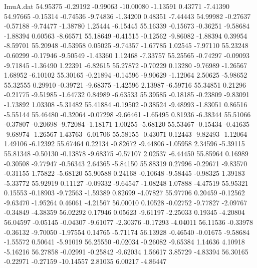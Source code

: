 \begin{filecontents}{ImuA.dat}
  54.95375   -0.29192   -0.99063  -10.00080   -1.13591    0.43771   -7.41390
  54.97665   -0.15314   -0.74536   -9.74836   -1.34200    0.48351   -7.44443
  54.99982   -0.27637   -0.57188   -9.74477   -1.38780    1.25444   -6.15445
  55.16339   -0.15673   -0.36251   -9.58684   -1.88394    0.60563   -8.66571
  55.18649   -0.41515   -0.12562   -9.86082   -1.88394    0.39954   -8.59701
  55.20948   -0.53958    0.05025   -9.74357   -1.67785    1.02545   -7.97110
  55.23248   -0.60299   -0.17946   -9.50549   -1.43360    1.12468   -7.33757
  55.25565   -0.74297   -0.09093   -9.71845   -1.36490    1.22391   -6.82615
  55.27872   -0.70229    0.13280   -9.76989   -1.26567    1.68952   -6.10102
  55.30165   -0.21894   -0.14596   -9.90629   -1.12064    2.50625   -5.98652
  55.32555    0.29910   -0.39721   -9.68375   -1.42596    2.13987   -6.59716
  55.34851    0.21296   -0.21775   -9.51985   -1.64732    0.84989   -6.63533
  55.39585   -0.18185   -0.23809   -9.83091   -1.73892    1.03308   -5.31482
  55.41884   -0.19502   -0.38524   -9.48993   -1.83051    0.86516   -5.55144
  55.46480   -0.32064   -0.07298   -9.66461   -1.65495    0.81936   -6.38344
  55.51066   -0.37807   -0.20698   -9.72084   -1.18171    1.00255   -5.68120
  55.53467   -0.15434   -0.41635   -9.68974   -1.26567    1.43763   -6.01706
  55.58155   -0.43071    0.12443   -9.82493   -1.12064    1.49106   -6.12392
  55.67464    0.22134   -0.82672   -9.44806   -1.05958    2.34596   -5.39115
  55.81348   -0.50130   -0.13878   -9.68375   -0.57107    2.02537   -6.44450
  55.85964    0.16989   -0.30508   -9.77947   -0.56343    2.64365   -5.84150
  55.88319    0.27996   -0.29671   -9.83570   -0.31155    1.75822   -5.68120
  55.90588    0.24168   -0.10648   -9.58445   -0.98325    1.39183   -5.33772
  55.92919    0.11127   -0.09332   -9.64547   -1.08248    1.07888   -4.47519
  55.95321    0.15553   -0.18903   -9.72563   -1.59389    0.82699   -4.07827
  55.97706    0.20459   -0.12562   -9.63470   -1.95264    0.46061   -4.21567
  56.00010    0.10528   -0.02752   -9.77827   -2.09767   -0.34849   -4.38359
  56.02292    0.17946    0.05623   -9.61197   -2.25033    0.19345   -4.20804
  56.04597   -0.05145   -0.04307   -9.61077   -2.30376   -0.17293   -4.04011
  56.11536   -0.33978   -0.36132   -9.70050   -1.97554    0.14765   -5.71174
  56.13928   -0.46540   -0.01675   -9.58684   -1.55572    0.50641   -5.91019
  56.25550   -0.02034   -0.26082   -9.65384    1.14636    4.10918   -5.16216
  56.27858   -0.02991   -0.25842   -9.62034    1.56617    3.85729   -4.83394
  56.30165   -0.22971   -0.27159  -10.14557    2.81035    6.00217   -4.86447

\end{filecontents}
